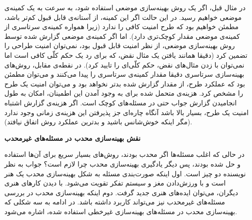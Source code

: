 در مثال قبل، اگر یک روش بهینه‌سازی موضعی استفاده شود، به سرعت به یک کمینه‌ی موضعی خواهیم رسید. در این حالت اگر این کمینه، از آستانه‌ی قابل قبول کم‌تر باشد، مطمئن خواهیم بود که طرح امنیت کافی را ندارد (زیرا همواره کمینه‌ی سرتاسری از کمینه‌ی موضعی مقدار کوچک‌تری دارد). اما اگر کمینه‌ی موضعی گزارش شده توسط روش بهینه‌سازی موضعی، از نظر امنیت قابل قبول بود، نمی‌توان امنیت طراحی را تضمین کرد (دقیقا همانند یافتن یک مثال نقض، که برای رد یک حکم کلّی کافی است اما نمی‌توان با زدن مثال‌های نقض، حکم کلّی‌ای را تایید کرد). در نقطه‌ی مقابل، روش‌های بهینه‌سازی سرتاسری دقیقا مقدار کمینه‌ی سرتاسری را پیدا می‌کنند و می‌توان مطمئن بود که عملکرد طرح، از مقدار گزارش شده بدتر نخواهد بود و می‌توان امنیت یک طرح را مشخص کرد. هزینه‌ی متحمل شده برای به وجود آمدن این اطمینان، امکان به طول انجامیدن گزارش جواب حتی در مسئله‌های کوچک است. اگر هزینه‌ی گزارش اشتباه امنیت یک طرح، بسیار بالا باشد آنگاه چاره‌ای جز پذیرفتن این هزینه‌ی زمانی وجود ندارد (مگر اینکه خوش‌شانس باشید و بدترین عملکرد روش اتفاق نیافتد).


\textbf{
نقش بهینه‌سازی محدب در مسئله‌های غیرمحدب
}

در حالی که اغلب مسئله‌ها اگر محدب بودند، روش‌های بسیار سریع برای آن‌ها استفاده و حل شده بودند، پس دیگر یادگیری بهینه‌سازی محدب چرا لازم است؟ جواب به نظر نویسنده دو چیز است. اول اینکه صورت‌بندی مسئله به شکل بهینه‌سازی محدب یک هنر است و با ورزش‌دادن مغز و سیستم تفکر تقویت می‌شود. با دیدن کارهای هنری دیگران، می‌توان ایده‌های هنری جدید گرفت. دوم اینکه بهینه‌سازی محدب در بررسی مسئله‌های غیرمحدب نیز می‌تواند کاربرد داشته باشد. در ادامه به سه شکلی که بهینه‌سازی محدب در مسئله‌های بهینه‌سازی غیرخطی استفاده شده، اشاره می‌شود.

